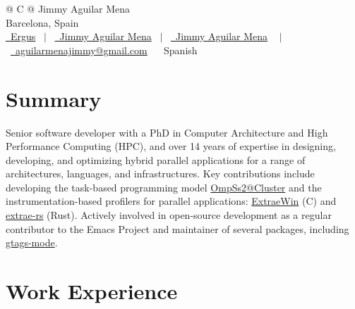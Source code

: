 \documentclass[a4paper,10pt]{article}
\def\CC{{C\nolinebreak[4]\hspace{-.05em}\raisebox{.2ex}{++}}}
\begin{document}
\pagestyle{empty}


\begin{tabularx}{\linewidth}{@{} C @{}}
  \Huge{Jimmy Aguilar Mena} \\
  Barcelona, Spain\\[7.5pt]
  \href{https://github.com/Ergus}{\raisebox{-0.05\height}\faGithub~Ergus} \
  $|$ \ \href{https://www.linkedin.com/in/jimmy-aguilar-mena-237063167/}{\raisebox{-0.05\height}\faLinkedin~Jimmy Aguilar Mena} \
  $|$ \ \href{https://scholar.google.es/citations?user=f_W11w8AAAAJ\&hl=es}{\raisebox{-0.05\height}\faGraduationCap~Jimmy Aguilar Mena} \
  $|$ \ \href{mailto:aguilarmenajimmy@gmail.com}{\raisebox{-0.05\height}\faEnvelope~aguilarmenajimmy@gmail.com} \
  \faPassport~Spanish \\
\end{tabularx}


\section{Summary}

Senior software developer with a PhD in Computer Architecture and High
Performance Computing (HPC), and over 14 years of expertise in
designing, developing, and optimizing hybrid parallel applications for
a range of architectures, languages, and infrastructures. Key
contributions include developing the task-based programming model
\href{https://github.com/bsc-pm/ompss-2-cluster-releases}{OmpSs2@Cluster}
and the instrumentation-based profilers for parallel applications:
\href{https://github.com/Ergus/ExtraeWin}{ExtraeWin} (\CC) and
\href{https://github.com/Ergus/extrae-rs}{extrae-rs} (Rust). Actively
involved in open-source development as a regular contributor to the
Emacs Project and maintainer of several packages, including
\href{https://elpa.gnu.org/packages/gtags-mode.html}{gtags-mode}.

\section{Work Experience}
\end{document}
